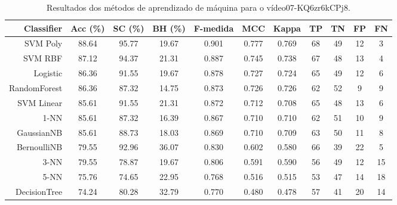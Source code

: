 \begin{table}[!htb]
\centering
\caption{Resultados dos métodos de aprendizado de máquina para o vídeo07-KQ6zr6kCPj8.}
\label{tab:07-KQ6zr6kCPj8}
\begin{tabular}{r|c|c|c|c|c|c|c|c|c|c}
\hline\hline
Classifier & Acc (\%) & SC (\%) & BH (\%) & F-medida & MCC & Kappa & TP & TN & FP & FN \\ \hline
SVM Poly & 88.64 & 95.77 & 19.67 & 0.901 & 0.777 & 0.769 & 68 & 49 & 12 & 3 \\ 
SVM RBF & 87.12 & 94.37 & 21.31 & 0.887 & 0.745 & 0.738 & 67 & 48 & 13 & 4 \\ 
Logistic & 86.36 & 91.55 & 19.67 & 0.878 & 0.727 & 0.724 & 65 & 49 & 12 & 6 \\ 
RandomForest & 86.36 & 87.32 & 14.75 & 0.873 & 0.726 & 0.726 & 62 & 52 & 9 & 9 \\ 
SVM Linear & 85.61 & 91.55 & 21.31 & 0.872 & 0.712 & 0.708 & 65 & 48 & 13 & 6 \\ 
1-NN & 85.61 & 87.32 & 16.39 & 0.867 & 0.710 & 0.710 & 62 & 51 & 10 & 9 \\ 
GaussianNB & 85.61 & 88.73 & 18.03 & 0.869 & 0.710 & 0.709 & 63 & 50 & 11 & 8 \\ 
BernoulliNB & 79.55 & 92.96 & 36.07 & 0.830 & 0.602 & 0.580 & 66 & 39 & 22 & 5 \\ 
3-NN & 79.55 & 78.87 & 19.67 & 0.806 & 0.591 & 0.590 & 56 & 49 & 12 & 15 \\ 
5-NN & 75.76 & 74.65 & 22.95 & 0.768 & 0.516 & 0.515 & 53 & 47 & 14 & 18 \\ 
DecisionTree & 74.24 & 80.28 & 32.79 & 0.770 & 0.480 & 0.478 & 57 & 41 & 20 & 14 \\ 
\hline\hline
\end{tabular}
\end{table}
